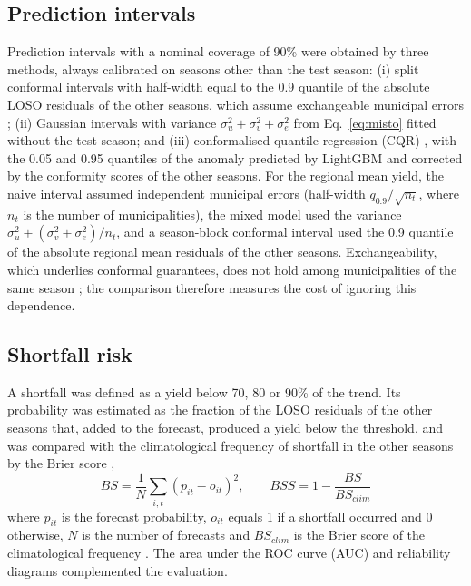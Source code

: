 \documentclass[pdflatex,sn-basic]{sn-jnl}
\begin{document}
\subsection{Prediction intervals}\label{sec:conformal}
Prediction intervals with a nominal coverage of 90\% were obtained by three methods, always calibrated on seasons other than the test season: (i) split conformal intervals with half-width equal to the 0.9 quantile of the absolute LOSO residuals of the other seasons, which assume exchangeable municipal errors \citep{lei2018}; (ii) Gaussian intervals with variance $\sigma^2_u + \sigma^2_v + \sigma^2_e$ from Eq.~\ref{eq:misto} fitted without the test season; and (iii) conformalised quantile regression (CQR) \citep{romano2019}, with the 0.05 and 0.95 quantiles of the anomaly predicted by LightGBM and corrected by the conformity scores of the other seasons. For the regional mean yield, the naive interval assumed independent municipal errors (half-width $q_{0.9}/\sqrt{n_t}$, where $n_t$ is the number of municipalities), the mixed model used the variance $\sigma^2_u + (\sigma^2_v + \sigma^2_e)/n_t$, and a season-block conformal interval used the 0.9 quantile of the absolute regional mean residuals of the other seasons. Exchangeability, which underlies conformal guarantees, does not hold among municipalities of the same season \citep{barber2023,mao2024}; the comparison therefore measures the cost of ignoring this dependence.

\subsection{Shortfall risk}\label{sec:risk}
A shortfall was defined as a yield below 70, 80 or 90\% of the trend. Its probability was estimated as the fraction of the LOSO residuals of the other seasons that, added to the forecast, produced a yield below the threshold, and was compared with the climatological frequency of shortfall in the other seasons by the Brier score \citep{brier1950},
\begin{equation}
BS = \frac{1}{N}\sum_{i,t} \left( p_{it} - o_{it} \right)^2, \qquad BSS = 1 - \frac{BS}{BS_{clim}} \label{eq:brier}
\end{equation}
where $p_{it}$ is the forecast probability, $o_{it}$ equals 1 if a shortfall occurred and 0 otherwise, $N$ is the number of forecasts and $BS_{clim}$ is the Brier score of the climatological frequency \citep{gneiting2007}. The area under the ROC curve (AUC) and reliability diagrams complemented the evaluation.
\end{document}
